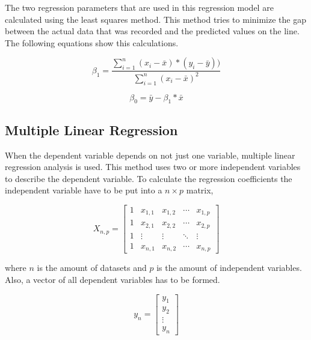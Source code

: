 The two regression parameters that are used in this regression model are calculated using the least squares method. This method tries to minimize the gap between the actual data that was recorded and the predicted values on the line. The following equations show this calculations.

\begin{equation}
\label{eq:beta1}
    \beta_1 = \frac{\sum_{i=1}^{n} (x_i - \bar{x}) * (y_i - \bar{y}))}{\sum_{i=1}^{n} (x_i - \bar{x})^2}
\end{equation}

\begin{equation}
    \label{eq:beta0}
    \beta_0 = \bar{y} - \beta_1 * \bar{x}
\end{equation}

\subsection{Multiple Linear Regression}

When the dependent variable depends on not just one variable, multiple linear regression analysis is used. This method uses two or more independent variables to describe the dependent variable. To calculate the regression coefficients the independent variable have to be put into a $ n \times p $ matrix,

\begin{equation}
    X_{n,p} =
        \begin{bmatrix}
            1 & x_{1,1} & x_{1,2} & \cdots & x_{1,p} \\
            1 & x_{2,1} & x_{2,2} & \cdots & x_{2,p} \\
            1 & \vdots & \vdots & \ddots & \vdots \\
            1 & x_{n,1} & x_{n,2} & \cdots & x_{n,p}
        \end{bmatrix}
\end{equation}

where $ n $ is the amount of datasets and $ p $ is the amount of independent variables. Also, a vector of all dependent variables has to be formed.

\begin{equation}
    y_{n} =
        \begin{bmatrix}
            y_{1} \\
            y_{2} \\
            \vdots \\
            y_{n}
        \end{bmatrix}
\end{equation}

